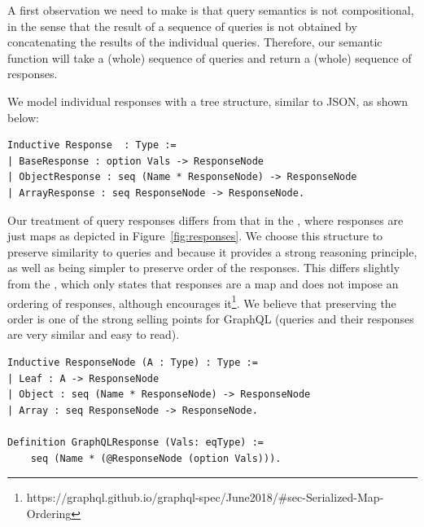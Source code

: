 A first observation we need to make is that query semantics is not compositional, in the sense that the result of a sequence of queries is not obtained by concatenating the results of the individual queries. Therefore, our semantic function will take a (whole) sequence of queries and return a (whole) sequence of responses.  

We model individual responses with a tree structure, similar to JSON, as shown below:
%
\begin{verbatim}
Inductive Response  : Type :=
| BaseResponse : option Vals -> ResponseNode
| ObjectResponse : seq (Name * ResponseNode) -> ResponseNode
| ArrayResponse : seq ResponseNode -> ResponseNode.
\end{verbatim}



Our treatment of query responses differs from that in the \spec, where responses are just maps 
as depicted in Figure~\ref{fig:responses}. We choose this structure to preserve similarity to queries and because it provides a strong reasoning principle, as well as being simpler to preserve order of the responses. This differs slightly from the \spec{}, which only states that responses are a map and does not impose an ordering of responses, although encourages it\footnote{https://graphql.github.io/graphql-spec/June2018/\#sec-Serialized-Map-Ordering}. We believe that preserving the order is one of the strong selling points for GraphQL (queries and their responses are very similar and easy to read). 

\begin{verbatim}
Inductive ResponseNode (A : Type) : Type :=
| Leaf : A -> ResponseNode
| Object : seq (Name * ResponseNode) -> ResponseNode
| Array : seq ResponseNode -> ResponseNode.

Definition GraphQLResponse (Vals: eqType) :=
    seq (Name * (@ResponseNode (option Vals))).
\end{verbatim}

